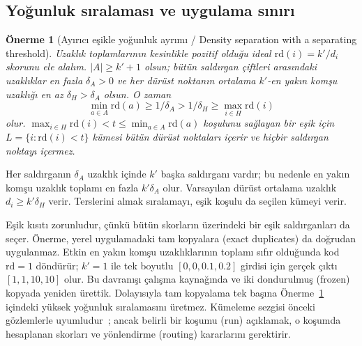 \documentclass[journal]{IEEEtran}
\newtheorem{proposition}{Önerme}
\newcommand{\rd}{\mathrm{rd}}
\begin{document}
\subsection{Yoğunluk sıralaması ve uygulama sınırı}
\begin{proposition}[Ayırıcı eşikle yoğunluk ayrımı / Density separation with a separating threshold]\label{prop:density}
Uzaklık toplamlarının kesinlikle pozitif olduğu ideal $\rd(i)=k'/d_i$ skorunu ele alalım. $|A|\geq k'+1$ olsun; bütün saldırgan çiftleri arasındaki uzaklıklar en fazla $\delta_A>0$ ve her dürüst noktanın ortalama $k'$-en yakın komşu uzaklığı en az $\delta_H>\delta_A$ olsun. O zaman
\[
\min_{a\in A}\rd(a)\geq1/\delta_A>1/\delta_H\geq\max_{i\in H}\rd(i)
\]
olur. $\max_{i\in H}\rd(i)<t\leq\min_{a\in A}\rd(a)$ koşulunu sağlayan bir eşik için $L=\{i:\rd(i)<t\}$ kümesi bütün dürüst noktaları içerir ve hiçbir saldırgan noktayı içermez.
\end{proposition}
\begin{IEEEproof}
Her saldırganın $\delta_A$ uzaklık içinde $k'$ başka saldırganı vardır; bu nedenle en yakın komşu uzaklık toplamı en fazla $k'\delta_A$ olur. Varsayılan dürüst ortalama uzaklık $d_i\geq k'\delta_H$ verir. Terslerini almak sıralamayı, eşik koşulu da seçilen kümeyi verir.
\end{IEEEproof}
Eşik kısıtı zorunludur, çünkü bütün skorların üzerindeki bir eşik saldırganları da seçer. Önerme, yerel uygulamadaki tam kopyalara (exact duplicates) da doğrudan uygulanmaz. Etkin en yakın komşu uzaklıklarının toplamı sıfır olduğunda kod $\rd=1$ döndürür; $k'=1$ ile tek boyutlu $[0,0,0.1,0.2]$ girdisi için gerçek çıktı $[1,1,10,10]$ olur. Bu davranışı çalışma kaynağında ve iki dondurulmuş (frozen) kopyada yeniden ürettik. Dolayısıyla tam kopyalama tek başına Önerme~\ref{prop:density} içindeki yüksek yoğunluk sıralamasını üretmez. Kümeleme sezgisi önceki gözlemlerle uyumludur~\cite{bellachia2026sok}; ancak belirli bir koşumu (run) açıklamak, o koşumda hesaplanan skorları ve yönlendirme (routing) kararlarını gerektirir.
\end{document}
